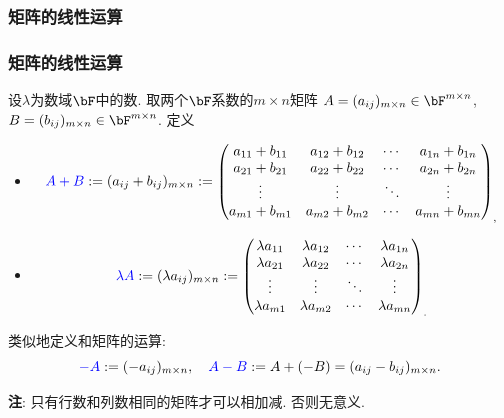 \subsubsection{矩阵的线性运算}
\begin{frame}\frametitle{矩阵的线性运算}
\begin{definition}[加法与数乘] 设$\lambda$为数域$\bF$中的数. 取两个$\bF$系数的$m\times n$矩阵 $A=(a_{ij})_{m\times n}\in \bF^{m\times n}$, $B=(b_{ij})_{m\times n}\in \bF^{m\times n}$. \pp  定义
\begin{itemize} \footnotesize
\item {}
\[\blue{A + B} :=(a_{ij}+b_{ij})_{m\times n}:=\begin{pmatrix}
a_{11}+b_{11} & a_{12}+b_{12} & \cdots & a_{1 n}+b_{1n}\\
a_{21}+b_{21} & a_{22}+b_{22} & \cdots & a_{2 n}+b_{2n}\\
\vdots & \vdots & \ddots & \vdots\\
a_{m 1}+b_{m1} & a_{m 2}+b_{m2} & \cdots & a_{mn}+b_{mn}
\end{pmatrix}_,\]
\pp
\item {}
\[\blue{\lambda A} :=(\lambda a_{ij})_{m\times n}:=\begin{pmatrix}
\lambda a_{11} & \lambda a_{12} & \cdots & \lambda a_{1 n}\\
\lambda a_{21} & \lambda a_{22} & \cdots & \lambda a_{2 n}\\
\vdots & \vdots & \ddots & \vdots\\
\lambda a_{m 1} & \lambda a_{m 2} & \cdots & \lambda a_{mn}
\end{pmatrix}_.\]
\end{itemize}
\pp
类似地定义和矩阵的运算:
\[\blue{-A}:=(-a_{ij})_{m\times n}, \quad \blue{A-B}:=A+(-B) = (a_{ij}-b_{ij})_{m\times n}.\]
\end{definition}
\textbf{注}: 只有行数和列数相同的矩阵才可以相加减. 否则无意义.
\end{frame}






